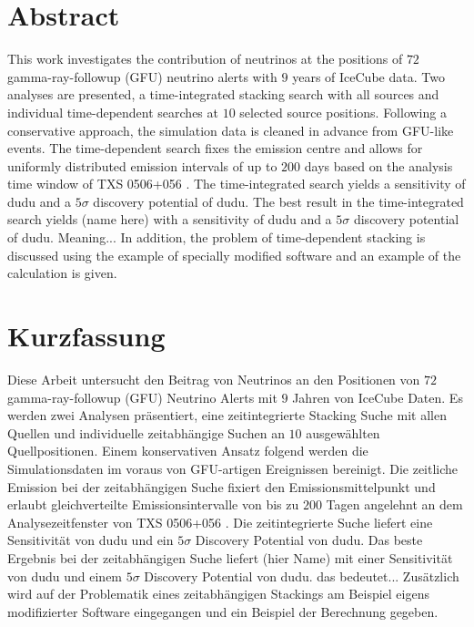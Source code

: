 \section*{Abstract}

This work investigates the contribution of neutrinos at the positions of $\num{72}$ gamma-ray-followup (GFU) neutrino alerts with $\num{9}$ years of IceCube data.
Two analyses are presented, a time-integrated stacking search with all sources and individual time-dependent searches at $\num{10}$ selected source positions.
Following a conservative approach, the simulation data is cleaned in advance from GFU-like events.
The time-dependent search fixes the emission centre and allows for uniformly distributed emission intervals of up to $\num{200}$ days based on the analysis time window of TXS 0506+056 \cite{txs}.
The time-integrated search yields a sensitivity of dudu and a $\num{5}\sigma$ discovery potential of dudu.
The best result in the time-integrated search yields (name here) with a sensitivity of dudu and a $\num{5}\sigma$ discovery potential of dudu.
Meaning...
In addition, the problem of time-dependent stacking is discussed using the example of specially modified software and an example of the calculation is given.

\section*{Kurzfassung}

Diese Arbeit untersucht den Beitrag von Neutrinos an den Positionen von $\num{72}$ gamma-ray-followup (GFU) Neutrino Alerts mit $\num{9}$ Jahren von IceCube Daten.
Es werden zwei Analysen präsentiert, eine zeitintegrierte Stacking Suche mit allen Quellen und individuelle zeitabhängige Suchen an $\num{10}$ ausgewählten Quellpositionen.
Einem konservativen Ansatz folgend werden die Simulationsdaten im voraus von GFU-artigen Ereignissen bereinigt.
Die zeitliche Emission bei der zeitabhängigen Suche fixiert den Emissionsmittelpunkt und erlaubt gleichverteilte Emissionsintervalle von bis zu $\num{200}$ Tagen angelehnt an dem Analysezeitfenster von TXS 0506+056 \cite{txs}.
Die zeitintegrierte Suche liefert eine Sensitivität von dudu und ein $\num{5}\sigma$ Discovery Potential von dudu.
Das beste Ergebnis bei der zeitabhängigen Suche liefert (hier Name) mit einer Sensitivität von dudu und einem $\num{5}\sigma$ Discovery Potential von dudu.
das bedeutet...
Zusätzlich wird auf der Problematik eines zeitabhängigen Stackings am Beispiel eigens modifizierter Software eingegangen und ein Beispiel der Berechnung gegeben.
